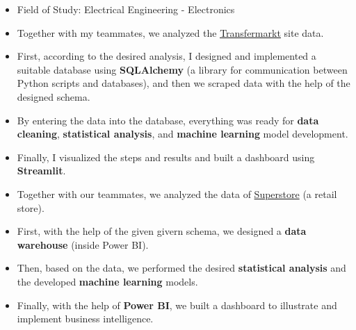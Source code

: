 \documentclass[10pt,a4paper,ragged2e,withhyper]{altacv}
\begin{document}
\begin{paracol}{2}
            \begin{itemize}
                \item {Field of Study: Electrical Engineering -  Electronics}
            \end{itemize}
        
            \begin{itemize}
                \item Together with my teammates, we analyzed the \textcolor{accent}{\href{https://www.transfermarkt.com/}{\underline{Transfermarkt}}} site data.
                \item First, according to the desired analysis, I designed and implemented a suitable database using \textbf{SQLAlchemy} (a library for communication between Python scripts and databases), and then we scraped data with the help of the designed schema.
                \item By entering the data into the database, everything was ready for \textbf{data cleaning}, \textbf{statistical analysis}, and \textbf{machine learning} model development.
                \item  Finally, I visualized the steps and results and built a dashboard using \textbf{Streamlit}.
            \end{itemize}
            \divider
            
            \begin{itemize}
                \item Together with our teammates, we analyzed the data of \underline{Superstore} (a retail store).
                \item  First, with the help of the given givern schema, we designed a \textbf{data warehouse} (inside Power BI).
                \item  Then, based on the data, we performed the desired \textbf{statistical analysis} and the developed \textbf{machine learning} models.
                \item  Finally, with the help of \textbf{Power BI}, we built a dashboard to illustrate and implement business intelligence.
            \end{itemize}
    \end{paracol}
\end{document}
